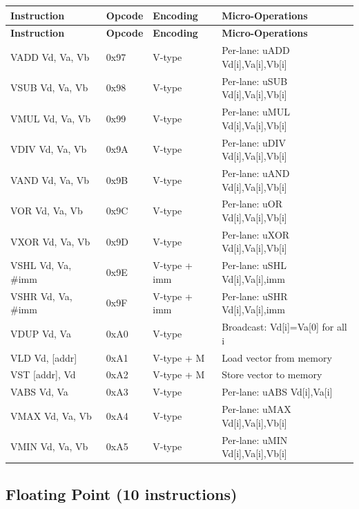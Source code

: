 \documentclass[12pt]{article}
\begin{document}
\begin{longtable}{@{}L{2.8cm}L{1.5cm}L{1.7cm}L{4.5cm}@{}}
\toprule
\textbf{Instruction} & \textbf{Opcode} & \textbf{Encoding} & \textbf{Micro-Operations} \\ \midrule
\endfirsthead
\toprule
\textbf{Instruction} & \textbf{Opcode} & \textbf{Encoding} & \textbf{Micro-Operations} \\ \midrule
\endhead
VADD Vd, Va, Vb & 0x97 & V-type & Per-lane: uADD Vd[i],Va[i],Vb[i] \\
VSUB Vd, Va, Vb & 0x98 & V-type & Per-lane: uSUB Vd[i],Va[i],Vb[i] \\
VMUL Vd, Va, Vb & 0x99 & V-type & Per-lane: uMUL Vd[i],Va[i],Vb[i] \\
VDIV Vd, Va, Vb & 0x9A & V-type & Per-lane: uDIV Vd[i],Va[i],Vb[i] \\
VAND Vd, Va, Vb & 0x9B & V-type & Per-lane: uAND Vd[i],Va[i],Vb[i] \\
VOR Vd, Va, Vb & 0x9C & V-type & Per-lane: uOR Vd[i],Va[i],Vb[i] \\
VXOR Vd, Va, Vb & 0x9D & V-type & Per-lane: uXOR Vd[i],Va[i],Vb[i] \\
VSHL Vd, Va, \#imm & 0x9E & V-type + imm & Per-lane: uSHL Vd[i],Va[i],imm \\
VSHR Vd, Va, \#imm & 0x9F & V-type + imm & Per-lane: uSHR Vd[i],Va[i],imm \\
VDUP Vd, Va & 0xA0 & V-type & Broadcast: Vd[i]=Va[0] for all i \\
VLD Vd, [addr] & 0xA1 & V-type + M & Load vector from memory \\
VST [addr], Vd & 0xA2 & V-type + M & Store vector to memory \\
VABS Vd, Va & 0xA3 & V-type & Per-lane: uABS Vd[i],Va[i] \\
VMAX Vd, Va, Vb & 0xA4 & V-type & Per-lane: uMAX Vd[i],Va[i],Vb[i] \\
VMIN Vd, Va, Vb & 0xA5 & V-type & Per-lane: uMIN Vd[i],Va[i],Vb[i] \\ \bottomrule
\end{longtable}

\subsection{Floating Point (10 instructions)}
\end{document}
